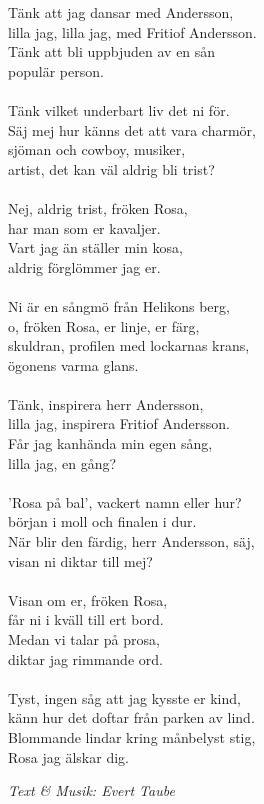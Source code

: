 \vspace{10pt}
Tänk att jag dansar med Andersson,\\
lilla jag, lilla jag, med Fritiof Andersson. \\
Tänk att bli uppbjuden av en sån \\
populär person.\\
\\
Tänk vilket underbart liv det ni för.\\
Säj mej hur känns det att vara charmör,\\
sjöman och cowboy, musiker,\\
artist, det kan väl aldrig bli trist?\\
\\
Nej, aldrig trist, fröken Rosa,\\
har man som er kavaljer.\\
Vart jag än ställer min kosa,\\
aldrig förglömmer jag er.\\
\\
Ni är en sångmö från Helikons berg,\\
o, fröken Rosa, er linje, er färg,\\
skuldran, profilen med lockarnas krans,\\
ögonens varma glans.\\
\\
Tänk, inspirera herr Andersson,\\
lilla jag, inspirera Fritiof Andersson.\\
Får jag kanhända min egen sång,\\
lilla jag, en gång?\\
\\
'Rosa på bal', vackert namn eller hur?\\
början i moll och finalen i dur.\\
När blir den färdig, herr Andersson, säj,\\
visan ni diktar till mej?\\
\\
Visan om er, fröken Rosa,\\
får ni i kväll till ert bord.\\
Medan vi talar på prosa,\\
diktar jag rimmande ord.\\
\\
Tyst, ingen såg att jag kysste er kind,\\
känn hur det doftar från parken av lind. \\
Blommande lindar kring månbelyst stig,\\
Rosa jag älskar dig.
\par
\vspace{10pt}
{\footnotesize\textit{Text \& Musik: Evert Taube}}
